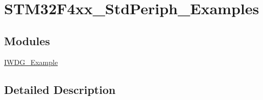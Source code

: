 \hypertarget{group___s_t_m32_f4xx___std_periph___examples}{\section{S\-T\-M32\-F4xx\-\_\-\-Std\-Periph\-\_\-\-Examples}
\label{group___s_t_m32_f4xx___std_periph___examples}
}
\subsection*{Modules}
\begin{DoxyCompactItemize}
\item 
\hyperlink{group___i_w_d_g___example}{I\-W\-D\-G\-\_\-\-Example}
\end{DoxyCompactItemize}


\subsection{Detailed Description}
